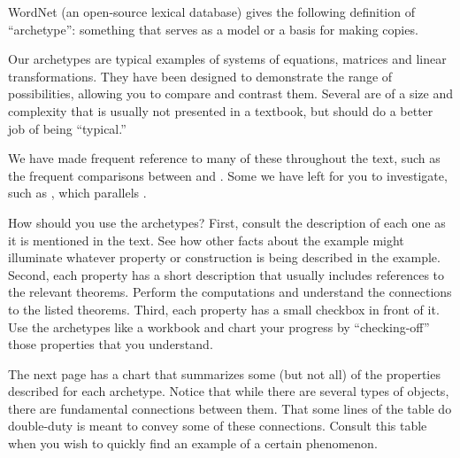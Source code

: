 %
WordNet (an open-source lexical database) gives the following definition of ``archetype'':  something that serves as a model or a basis for making copies.\par
%
Our archetypes are typical examples of systems of equations, matrices and linear transformations.  They have been designed to demonstrate the range of possibilities, allowing you to compare and contrast them.  Several are of a size and complexity that is usually not presented in a textbook, but should do a better job of being ``typical.''\par
%
We have made frequent reference to many of these throughout the text, such as the frequent comparisons between  and .  Some we have left for you to investigate, such as , which parallels .\par
%
How should you use the archetypes?  First, consult the description of each one as it is mentioned in the text.  See how other facts about the example might illuminate whatever property or construction is being described in the example.  Second, each property has a short description that usually includes references to the relevant theorems.  Perform the computations and understand the connections to the listed theorems.  Third, each property has a small checkbox in front of it.  Use the archetypes like a workbook and chart your progress by ``checking-off'' those properties that you understand.\par
%
The next page has a chart that summarizes some (but not all) of the properties described for each archetype.  Notice that while there are several types of objects, there are fundamental connections between them.  That some lines of the table do double-duty is meant to convey some of these connections.  Consult this table when you wish to quickly find an example of a certain phenomenon.
\newpage
%
%
%
\vspace*{\fill}

\par\vspace*{\fill}\newpage
%
%
%
%
%
%
%
